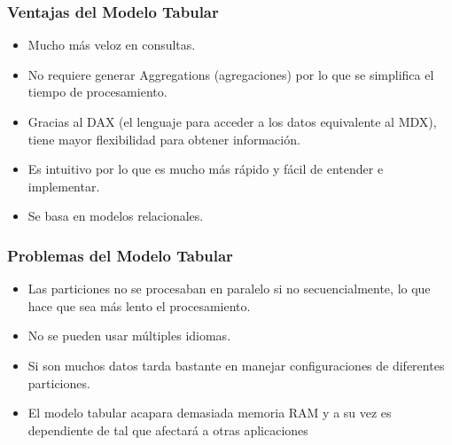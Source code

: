 \documentclass[11pt,a4paper]{article}
\begin{document}
	 		\subsubsection{Ventajas del Modelo Tabular} 
			\begin{itemize}
	 			
	 			\item Mucho más veloz en consultas.
	 			\item No requiere generar Aggregations (agregaciones) por lo que se simplifica el tiempo de procesamiento.
	 			\item Gracias al DAX (el lenguaje para acceder a los datos equivalente al MDX), tiene mayor flexibilidad para obtener información.
	 			\item Es intuitivo por lo que es mucho más rápido y fácil de entender e implementar.
	 			\item Se basa en modelos relacionales.
	 			
 			\end{itemize}
 		
	 		\subsubsection{Problemas del Modelo Tabular} 
			\begin{itemize}
				
				\item Las particiones no se procesaban en paralelo si no secuencialmente, lo que hace que sea más lento el procesamiento.
				\item No se pueden usar múltiples idiomas.
				\item Si son muchos datos tarda bastante en manejar configuraciones de diferentes particiones.
				\item El modelo tabular acapara demasiada memoria RAM y a su vez es dependiente de tal que afectará a otras aplicaciones
				
			\end{itemize} 	
		
\end{document}

